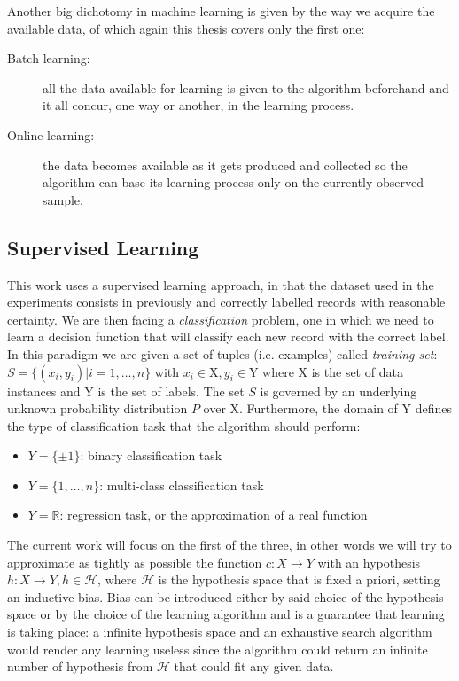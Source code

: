 Another big dichotomy in machine learning is given by the way we acquire the
available data, of which again this thesis covers only the first one:

\begin{description}
    \item [Batch learning:] all the data available for learning is given to the
        algorithm beforehand and it all concur, one way or another, in the
        learning process.
    \item [Online learning:] the data becomes available as it gets produced
        and collected so the algorithm can base its learning process only
        on the currently observed sample.
\end{description}

\subsection{Supervised Learning}

This work uses a supervised learning approach, in that the dataset
used in the experiments consists in previously and correctly labelled records with
reasonable certainty.
We are then facing a \emph{classification} problem, one in which we need to learn
a decision function that will classify each new record with the correct label.
In this paradigm we are given a set of tuples (i.e. examples) called \emph{training set}:
$S = \{(x_i, y_i)| i=1,\dots,n\}$ with $x_i \in \mathrm{X}, y_i \in \mathrm{Y}$
where $\mathrm{X}$ is the set of data instances and $\mathrm{Y}$ is the set of
labels.
The set $S$ is governed by an underlying unknown probability distribution $P$ over
$\mathrm{X}$.
Furthermore, the domain of $\mathrm{Y}$ defines the type of classification task
that the algorithm should perform:
\begin{itemize}
    \item $Y = \{\pm{1}\}$: binary classification task
    \item $Y = \{1,\dots,n\}$: multi-class classification task
    \item $Y = \mathbb{R}$: regression task, or the approximation of a real
        function
\end{itemize}

The current work will focus on the first of the three, in other words we will
try to approximate as tightly as possible the function $c:X\to Y$ with an
hypothesis $h:X\to Y, h\in \mathcal{H}$, where $\mathcal{H}$ is the hypothesis
space that is fixed a priori, setting an inductive bias.
Bias can be introduced either by said choice of the hypothesis space or by the
choice of the learning algorithm and is a guarantee that learning is taking place:
a infinite hypothesis space and an exhaustive search algorithm would render
any learning useless since the algorithm could return an infinite number of
hypothesis from $\mathcal{H}$ that could fit any given data.

